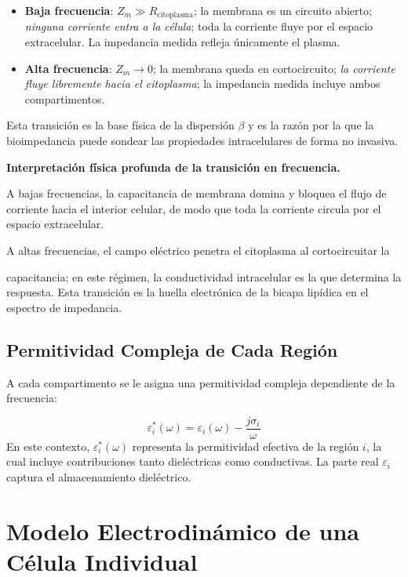 \documentclass[12pt]{article}
\begin{document}
\begin{itemize}
\item \textbf{Baja frecuencia}: $Z_m \gg R_{\text{citoplasma}}$; la membrana es un
circuito abierto; \emph{ninguna corriente entra a la c\'elula}; toda la corriente
fluye por el espacio extracelular. La impedancia medida refleja \'unicamente el
plasma.
\item \textbf{Alta frecuencia}: $Z_m \to 0$; la membrana queda en cortocircuito;
\emph{la corriente fluye libremente hacia el citoplasma}; la impedancia medida
incluye ambos compartimentos.
\end{itemize}

Esta transici\'on es la base f\'isica de la dispersi\'on $\beta$ y es la raz\'on por la que la
bioimpedancia puede sondear las propiedades intracelulares de forma no invasiva.

\noindent\textbf{Interpretaci\'on f\'isica profunda de la transici\'on en frecuencia.}

A bajas frecuencias, la capacitancia de membrana domina y bloquea el flujo de corriente
hacia el interior celular, de modo que toda la corriente circula por el espacio extracelular.

A altas frecuencias, el campo el\'ectrico penetra el citoplasma al cortocircuitar la

capacitancia; en este r\'egimen, la conductividad intracelular es la que determina la
respuesta. Esta transici\'on es la huella electr\'onica de la bicapa lip\'idica en el espectro
de impedancia.

\subsection{Permitividad Compleja de Cada Regi\'on}

A cada compartimento se le asigna una permitividad compleja dependiente de la frecuencia:

\begin{equation}
\varepsilon_i^*(\omega) = \varepsilon_i(\omega) - \frac{j\sigma_i}{\omega}
\end{equation}
En este contexto, $\varepsilon_i^*(\omega)$ representa la permitividad efectiva de la regi\'on $i$,
la cual incluye contribuciones tanto diel\'ectricas como conductivas. La parte real $\varepsilon_i$
captura el almacenamiento diel\'ectrico.


\section{Modelo Electrodin\'amico de una C\'elula Individual}
\end{document}
